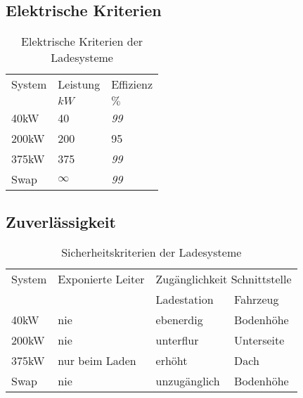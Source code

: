\subsection{Elektrische Kriterien}
\begin{table}[h!]\centering
	\begin{tabularx}{\linewidth}{XXX}
		\toprule
		System & Leistung & Effizienz \\
		       & $kW$     & $\%$      \\ \midrule
		40kW   & 40       & \emph{99} \\
		200kW  & 200      & 95 \\
		375kW  & 375      & \emph{99} \\
		Swap   & $\infty$ & \emph{99} \\ \bottomrule
	\end{tabularx}
	\caption{Elektrische Kriterien der Ladesysteme}
	\label{tab_el_Ladesys}
\end{table}
\FloatBarrier

\subsection{Zuverlässigkeit}

\begin{table}[h!]\centering
	\begin{tabularx}{\linewidth}{XXXX}
		\toprule
		System         & Exponierte Leiter & \multicolumn{2}{c}{Zugänglichkeit Schnittstelle} \\
		\cmidrule{3-4} &                   & Ladestation  & Fahrzeug                          \\ \midrule
		40kW           & nie               & ebenerdig    & Bodenhöhe                         \\
		200kW          & nie               & unterflur    & Unterseite                        \\
		375kW          & nur beim Laden    & erhöht        & Dach                              \\
		Swap           & nie               & unzugänglich & Bodenhöhe                         \\ \bottomrule
	\end{tabularx}
	\caption{Sicherheitskriterien der Ladesysteme}
	\label{tab_sich_Ladesys}
\end{table}
\FloatBarrier



